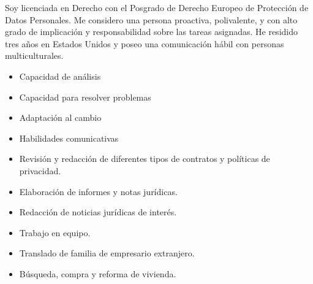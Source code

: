 \documentclass[10pt,a4paper,ragged2e,withhyper]{altacv}
\begin{document}
\thispagestyle{empty}
\clearpage
\makecvheader

\begin{paracol}{2}

Soy licenciada en Derecho con el Posgrado de Derecho Europeo de Protecci\'on de Datos Personales. Me considero una persona proactiva, polivalente, y con alto grado de implicaci\'on y responsabilidad sobre las tareas asignadas. He residido tres a\~nos en Estados Unidos y poseo una comunicaci\'on h\'abil con personas multiculturales.


\begin{minipage}{\linewidth}
\end{minipage}





\begin{itemize}
  \item Capacidad de an\'alisis
  \item Capacidad para resolver problemas
  \item Adaptaci\'on al cambio
  \item Habilidades comunicativas
\end{itemize}

\switchcolumn

\begin{itemize}
  \item Revisi\'on y redacci\'on de diferentes tipos de contratos y pol\'iticas de privacidad.
  \item Elaboraci\'on de informes y notas jur\'idicas.
  \item Redacci\'on de noticias jur\'idicas de inter\'es.
  \item Trabajo en equipo.
\end{itemize}

\begin{itemize}
  \item Translado de familia de empresario extranjero.
  \item B\'usqueda, compra y reforma de vivienda.
\end{itemize}


\end{paracol}
\end{document}
